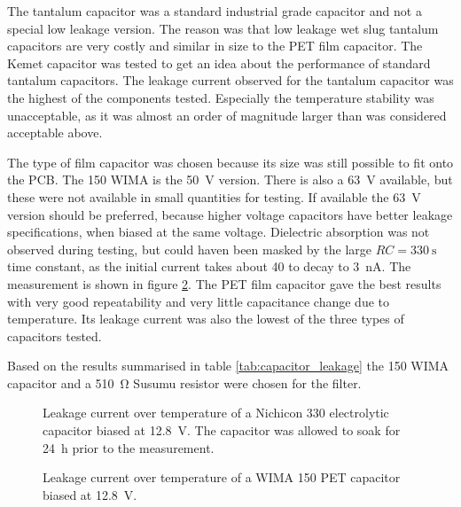 The tantalum capacitor was a standard industrial grade capacitor and not a special low leakage version. The reason was that low leakage wet slug tantalum capacitors are very costly and similar in size to the PET film capacitor. The Kemet  capacitor was tested to get an idea about the performance of standard tantalum capacitors. The leakage current observed for the tantalum capacitor was the highest of the components tested. Especially the temperature stability was unacceptable, as it was almost an order of magnitude larger than was considered acceptable above.

The type of film capacitor was chosen because its size was still possible to fit onto the PCB. The \qty{150}{\uF} WIMA  is the \qty{50}{\V} version. There is also a \qty{63}{\V} available, but these were not available in small quantities for testing. If available the \qty{63}{\V} version should be preferred, because higher voltage capacitors have better leakage specifications, when biased at the same voltage. Dielectric absorption was not observed during testing, but could haven been masked by the large $RC = \qty{330}{\s}$ time constant, as the initial current takes about \qty{40}{\min} to decay to \qty{3}{\nA}. The measurement is shown in figure \ref{fig:leakage_current_mks4}. The PET film capacitor gave the best results with very good repeatability and very little capacitance change due to temperature. Its leakage current was also the lowest of the three types of capacitors tested.

Based on the results summarised in table \ref{tab:capacitor_leakage} the \qty{150}{\uF} WIMA  capacitor and a \qty{510}{\ohm} Susumu  resistor were chosen for the filter.

\begin{figure}[ht]
    \centering
    
    \caption{Leakage current over temperature of a Nichicon  \qty{330}{\uF} electrolytic capacitor biased at \qty{12.8}{\V}. The capacitor was allowed to soak for \qty{24}{\hour} prior to the measurement.}
    \label{fig:leakage_current_ukl}
\end{figure}
\clearpage

\begin{figure}[ht]
    \centering
    
    \caption{Leakage current over temperature of a WIMA  \qty{150}{\uF} PET capacitor biased at \qty{12.8}{\V}.}
    \label{fig:leakage_current_mks4}
\end{figure}
\clearpage

